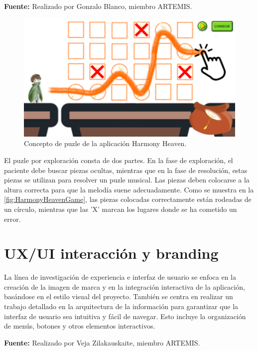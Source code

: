 \begin{center}
	\textbf{Fuente:} Realizado por Gonzalo Blanco, miembro ARTEMIS.
	\vspace{-18pt}
\end{center}

\begin{figure}[h!]
	\centering
	\includegraphics[width=0.7\linewidth]{Figuras/Desarrollo/HarmonyHeaven.png}
	\caption{Concepto de puzle de la aplicación Harmony Heaven.}
	\label{fig:HarmonyHeavenGame}
\end{figure}

El puzle por exploración consta de dos partes. En la fase de exploración, el paciente debe buscar piezas ocultas, mientras que en la fase de resolución, estas piezas se utilizan para resolver un puzle musical. Las piezas deben colocarse a la altura correcta para que la melodía suene adecuadamente. Como se muestra en la \autoref{fig:HarmonyHeavenGame}, las piezas colocadas correctamente están rodeadas de un círculo, mientras que las 'X' marcan los lugares donde se ha cometido un error.

\section{UX/UI interacción y branding}

La línea de investigación de experiencia e interfaz de usuario se enfoca en la creación de la imagen de marca y en la integración interactiva de la aplicación, basándose en el estilo visual del proyecto. También se centra en realizar un trabajo detallado en la arquitectura de la información para garantizar que la interfaz de usuario sea intuitiva y fácil de navegar. Esto incluye la organización de menús, botones y otros elementos interactivos.

\begin{center}
	\textbf{Fuente:} Realizado por Veja Zilakauskaite, miembro ARTEMIS.
	\vspace{-16pt}
\end{center}

